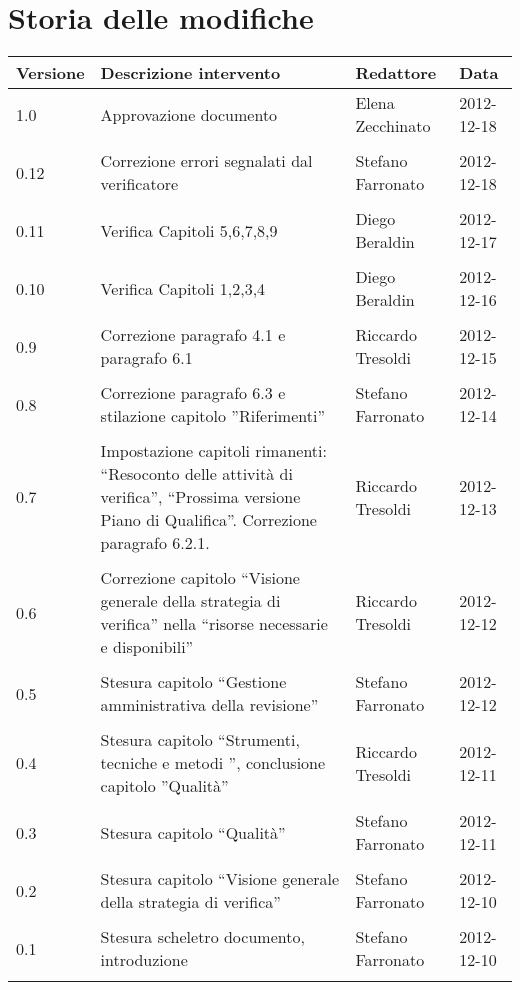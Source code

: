 \section*{Storia delle modifiche}
\begin{tabularx}{\textwidth}{lXll}
\toprule
Versione & Descrizione intervento & Redattore & Data\\
\midrule %
1.0 & Approvazione documento & Elena Zecchinato & 2012-12-18\\\\
0.12 & Correzione errori segnalati dal verificatore & Stefano Farronato & 2012-12-18\\\\
0.11 & Verifica Capitoli 5,6,7,8,9 & Diego Beraldin & 2012-12-17\\\\
0.10 & Verifica Capitoli 1,2,3,4 & Diego Beraldin & 2012-12-16\\\\
0.9 & Correzione paragrafo 4.1 e paragrafo 6.1 & Riccardo Tresoldi & 2012-12-15\\\\
0.8 & Correzione paragrafo 6.3 e stilazione capitolo ''Riferimenti''& Stefano Farronato & 2012-12-14\\\\
0.7 & Impostazione capitoli rimanenti: ``Resoconto delle attività di verifica'', ``Prossima versione Piano di Qualifica''. Correzione paragrafo 6.2.1. & Riccardo Tresoldi & 2012-12-13\\\\
0.6 & Correzione capitolo ``Visione generale della strategia di verifica'' nella ``risorse necessarie e disponibili'' & Riccardo Tresoldi & 2012-12-12\\\\
0.5 & Stesura capitolo ``Gestione amministrativa della revisione''& Stefano Farronato & 2012-12-12\\\\
0.4 & Stesura capitolo ``Strumenti, tecniche e metodi '', conclusione capitolo ''Qualità'' & Riccardo Tresoldi & 2012-12-11\\\\
0.3 & Stesura capitolo ``Qualità'' & Stefano Farronato & 2012-12-11\\\\
0.2 & Stesura capitolo ``Visione generale della strategia di verifica'' & Stefano Farronato & 2012-12-10\\\\
0.1 & Stesura scheletro documento, introduzione & Stefano Farronato & 2012-12-10\\\\
\bottomrule
\end{tabularx}
\newpage

